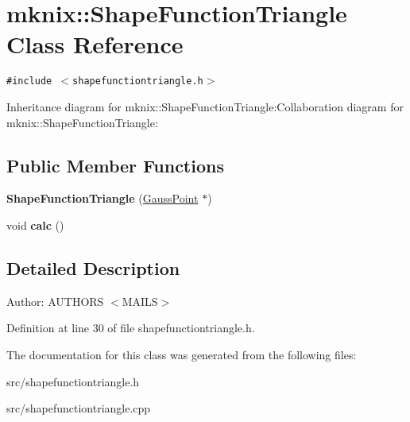 \hypertarget{classmknix_1_1ShapeFunctionTriangle}{
\section{mknix::ShapeFunctionTriangle Class Reference}
\label{classmknix_1_1ShapeFunctionTriangle}
}
{\tt \#include $<$shapefunctiontriangle.h$>$}

Inheritance diagram for mknix::ShapeFunctionTriangle:Collaboration diagram for mknix::ShapeFunctionTriangle:\subsection*{Public Member Functions}
\begin{CompactItemize}
\item 
\hypertarget{classmknix_1_1ShapeFunctionTriangle_145ae0d6b80eafac1310e2d74e738322}{
\textbf{ShapeFunctionTriangle} (\hyperlink{classmknix_1_1GaussPoint}{GaussPoint} $\ast$)}
\label{classmknix_1_1ShapeFunctionTriangle_145ae0d6b80eafac1310e2d74e738322}

\item 
\hypertarget{classmknix_1_1ShapeFunctionTriangle_7ebaa0c670cb55ee1988d9a0a5400f62}{
void \textbf{calc} ()}
\label{classmknix_1_1ShapeFunctionTriangle_7ebaa0c670cb55ee1988d9a0a5400f62}

\end{CompactItemize}


\subsection{Detailed Description}
\begin{Desc}
\item[Author:]AUTHORS $<$MAILS$>$ \end{Desc}


Definition at line 30 of file shapefunctiontriangle.h.

The documentation for this class was generated from the following files:\begin{CompactItemize}
\item 
src/shapefunctiontriangle.h\item 
src/shapefunctiontriangle.cpp\end{CompactItemize}
